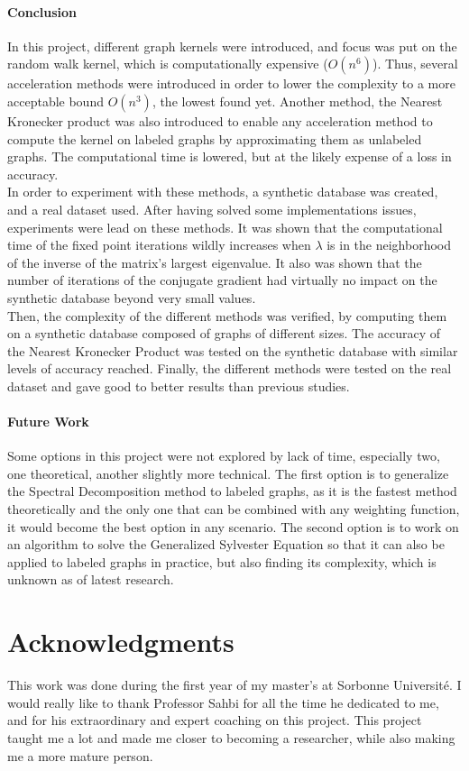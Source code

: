 \documentclass{article}
\theoremstyle{definition}
\begin{document}
\paragraph{Conclusion}
In this project, different graph kernels were introduced, and focus was put on the random walk kernel, which is computationally expensive ($O(n^6)$). Thus, several acceleration methods were introduced in order to lower the complexity to a more acceptable bound $O(n^3)$, the lowest found yet. Another method, the Nearest Kronecker product was also introduced to enable any acceleration method to compute the kernel on labeled graphs by approximating them as unlabeled graphs. The computational time is lowered, but at the likely expense of a loss in accuracy.\\
In order to experiment with these methods, a synthetic database was created, and a real dataset used. After having solved some implementations issues, experiments were lead on these methods. It was shown that the computational time of the fixed point iterations wildly increases when $\lambda$ is in the neighborhood of the inverse of the matrix's largest eigenvalue. It also was shown that the number of iterations of the conjugate gradient had virtually no impact on the synthetic database beyond very small values.\\
Then, the complexity of the different methods was verified, by computing them on a synthetic database composed of graphs of different sizes. The accuracy of the Nearest Kronecker Product was tested on the synthetic database with similar levels of accuracy reached. Finally, the different methods were tested on the real dataset and gave good to better results than previous studies.
\paragraph{Future Work}
Some options in this project were not explored by lack of time, especially two, one theoretical, another slightly more technical. The first option is to generalize the Spectral Decomposition method to labeled graphs, as it is the fastest method theoretically and the only one that can be combined with any weighting function, it would become the best option in any scenario. The second option is to work on an algorithm to solve the Generalized Sylvester Equation so that it can also be applied to labeled graphs in practice, but also finding its complexity, which is unknown as of latest research.

\section*{Acknowledgments}
This work was done during the first year of my master's at Sorbonne Université. I would really like to thank Professor Sahbi for all the time he dedicated to me, and for his extraordinary and expert coaching on this project. This project taught me a lot and made me closer to becoming a researcher, while also making me a more mature person.
\end{document}
